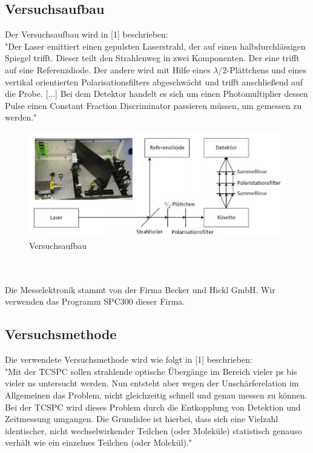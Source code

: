 \documentclass{article}
\begin{document}
\subsection{Versuchsaufbau}
Der Versuchsaufbau wird in [1] beschrieben:\\
"Der Laser emittiert einen gepulsten Laserstrahl, der auf einen halbdurchlässigen Spiegel trifft.
Dieser teilt den Strahlenweg in zwei Komponenten. Der eine trifft auf eine Referenzdiode. Der
andere wird mit Hilfe eines $\lambda$/2-Plättchens und eines vertikal orientierten Polarisationsfilters
abgeschwächt und trifft anschließend auf die Probe. [...] Bei dem Detektor handelt es sich
um einen Photomultiplier dessen Pulse einen Constant Fraction Discriminator passieren
müssen, um gemessen zu werden."
\begin{figure}[h]
  \centering
  \includegraphics[width=\textwidth]{Bilder/aufbau.jpeg}
  \caption{Versuchsaufbau}
\end{figure}
\\
\\
Die Messelektronik stammt von der Firma Becker und Hickl GmbH. Wir verwenden das Programm SPC300 dieser Firma.


\subsection{Versuchsmethode}
Die verwendete Versuchsmethode wird wie folgt in [1] beschrieben: \\
"Mit der TCSPC sollen strahlende optische Übergänge im Bereich vieler ps bis vieler ns
untersucht werden. Nun entsteht aber wegen der Unschärferelation im Allgemeinen das
Problem, nicht gleichzeitig schnell und genau messen zu können. Bei der TCSPC wird dieses
Problem durch die Entkopplung von Detektion und Zeitmessung umgangen. Die Grundidee ist
hierbei, dass sich eine Vielzahl identischer, nicht wechselwirkender Teilchen (oder Moleküle)
statistisch genauso verhält wie ein einzelnes Teilchen (oder Molekül)."
\end{document}
